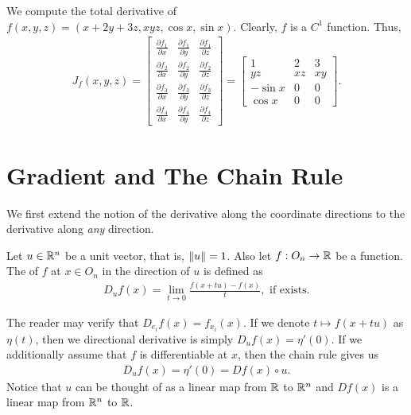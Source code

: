 \begin{example}
    We compute the total derivative of $f(x,y,z) = (x+2y+3z,xyz,\cos x, \sin x)$. Clearly, $f$ is a $C^{1}$ function. Thus,
    \begin{align}
        J_{f}(x,y,z) = \begin{bmatrix}
            \frac{\partial f_{1}}{\partial x} & \frac{\partial f_{1}}{\partial y} & \frac{\partial f_{1}}{\partial z} \\
            \frac{\partial f_{2}}{\partial x} & \frac{\partial f_{2}}{\partial y} & \frac{\partial f_{2}}{\partial z} \\
            \frac{\partial f_{3}}{\partial x} & \frac{\partial f_{3}}{\partial y} & \frac{\partial f_{3}}{\partial z} \\
            \frac{\partial f_{4}}{\partial x} & \frac{\partial f_{4}}{\partial y} & \frac{\partial f_{4}}{\partial z}
        \end{bmatrix} = \begin{bmatrix}
            1 & 2 & 3 \\
            yz & xz & xy \\
            -\sin x & 0 & 0 \\
            \cos x & 0 & 0
        \end{bmatrix}.
    \end{align}
\end{example}

\section{Gradient and The Chain Rule}

We first extend the notion of the derivative along the coordinate directions to the derivative along \textit{any} direction.

\begin{definition}
    Let $u \in \mathbb{R}^{n}$ be a unit vector, that is, $\left\lVert u\right\rVert = 1$. Also let $f:O_{n} \to \mathbb{R}$ be a function. The  of $f$ at $x \in O_{n}$ in the direction of $u$ is defined as
    \begin{align}
        D_{u}f(x) = \lim_{t \to 0} \frac{f(x+tu)-f(x)}{t}, \text{ if exists.}
    \end{align}
\end{definition}

The reader may verify that $D_{e_{i}}f(x) = f_{x_{i}}(x)$. If we denote $t \mapsto f(x+tu)$ as $\eta(t)$, then we directional derivative is simply $D_{u}f(x) = \eta'(0)$. If we additionally assume that $f$ is differentiable at $x$, then the chain rule gives us
\begin{align}
    D_{u}f(x) = \eta'(0) = Df(x) \circ u.
\end{align}
Notice that $u$ can be thought of as a linear map from $\mathbb{R}$ to $\mathbb{R}^{n}$ and $Df(x)$ is a linear map from $\mathbb{R}^{n}$ to $\mathbb{R}$.

